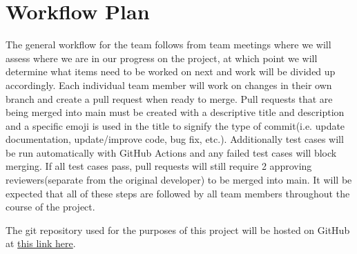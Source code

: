 \documentclass{article}
\begin{document}
\newpage
\section{Workflow Plan}

The general workflow for the team follows from team meetings where we will assess where we are in our progress on the project, at which point we will determine what items need to be worked on next and work will be divided up accordingly. Each individual team member will work on changes in their own branch and create a pull request when ready to merge. Pull requests that are being merged into main must be created with a descriptive title and description and a specific emoji is used in the title to signify the type of commit(i.e. update documentation, update/improve code, bug fix, etc.). Additionally test cases will be run automatically with GitHub Actions and any failed test cases will block merging. If all test cases pass, pull requests will still require 2 approving reviewers(separate from the original developer) to be merged into main. It will be expected that all of these steps are followed by all team members throughout the course of the project.

The git repository used for the purposes of this project will be hosted on GitHub at  \href{https://github.com/John-Popovici/duel-of-the-eights.git}{this link here}.\newline
\end{document}
